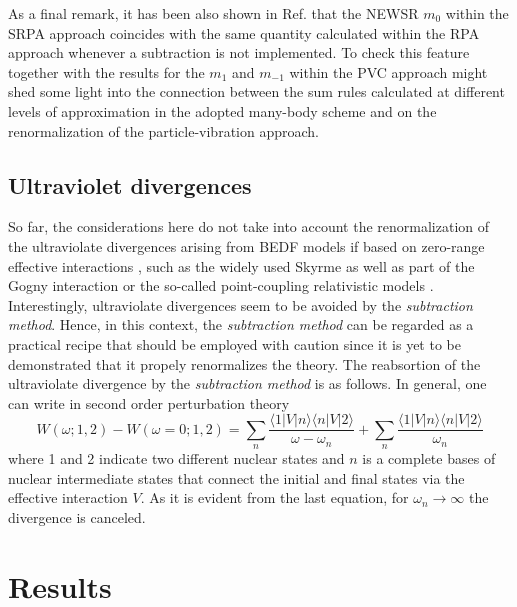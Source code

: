 \documentclass[12pt,a4paper,final]{iopart}
\begin{document}
As a final remark, it has been also shown in Ref.\cite{wambach1990} that the NEWSR $m_0$ within the SRPA approach coincides with the same quantity calculated within the RPA approach whenever a subtraction is not implemented. To check this feature together with the results for the $m_1$ and $m_{-1}$ within the PVC approach might shed some light into the connection between the sum rules calculated at different levels of approximation in the adopted many-body scheme and on the renormalization of the particle-vibration approach.

\subsection{Ultraviolet divergences}
\label{reno}

So far, the considerations here do not take into account the renormalization of the ultraviolate divergences arising from BEDF models if based on zero-range effective interactions \cite{moghrabi2010}, such as the widely used Skyrme as well as part of the Gogny interaction \cite{decharge1980} or the so-called point-coupling relativistic models \cite{nikolaus1992}. Interestingly, ultraviolate divergences seem to be avoided by the {\it subtraction method}. Hence, in this context, the {\it subtraction method} can be regarded as a practical recipe that should be employed with caution since it is yet to be demonstrated that it propely renormalizes the theory. The reabsortion of the ultraviolate divergence by the {\it subtraction method} is as follows. In general, one can write in second order perturbation theory
\begin{equation}
W(\omega;1,2)-W(\omega=0;1,2) = \sum_{n}\frac{\langle 1\vert V\vert n\rangle\langle n\vert V\vert 2\rangle}{\omega-\omega_n} + \sum_{n}\frac{\langle 1\vert V\vert n\rangle\langle n\vert V\vert 2\rangle}{\omega_n}
\end{equation}
where 1 and 2 indicate two different nuclear states and $n$ is a complete bases of nuclear intermediate states that connect the initial and final states via the effective interaction $V$. As it is evident from the last equation, for $\omega_n \rightarrow \infty$ the divergence is canceled. 


\section{Results}
\label{results}
\end{document}
